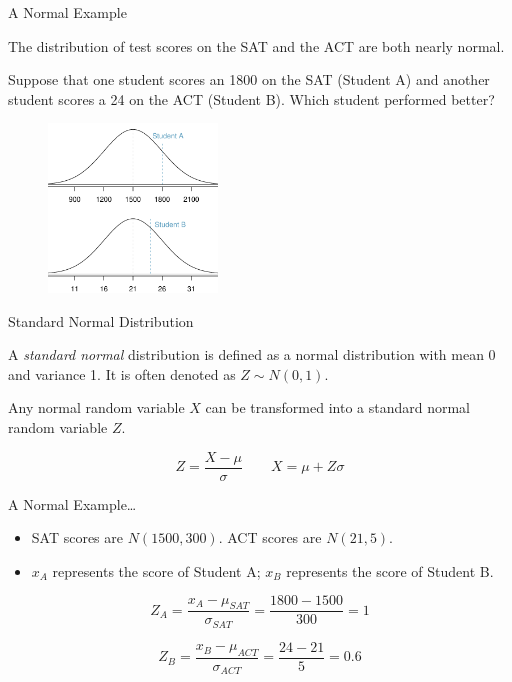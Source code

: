 \documentclass[ignorenonframetext,aspectratio=169]{beamer}
\begin{document}
\begin{frame}{A Normal Example}

The distribution of test scores on the SAT and the ACT are both nearly
normal.

Suppose that one student scores an 1800 on the SAT (Student A) and
another student scores a 24 on the ACT (Student B). Which student
performed better?

\begin{figure}[]
\includegraphics[width=0.4\textwidth]
{./figures/satActNormals.pdf}
\end{figure}

\end{frame}

\begin{frame}{Standard Normal Distribution}

A \emph{standard normal} distribution is defined as a normal
distribution with mean 0 and variance 1. It is often denoted as
\(Z \sim N(0, 1)\).

Any normal random variable \(X\) can be transformed into a standard
normal random variable \(Z\).

\[Z = \dfrac{X - \mu}{\sigma} \qquad X = \mu + Z\sigma \]

\end{frame}

\begin{frame}{A Normal Example\ldots{}}

\begin{itemize}
\item
  SAT scores are \(N(1500, 300)\). ACT scores are \(N(21,5)\).
\item
  \(x_A\) represents the score of Student A; \(x_B\) represents the
  score of Student B.
\end{itemize}

\[Z_{A} = \frac{x_{A} - \mu_{SAT}}{\sigma_{SAT}} = \frac{1800-1500}{300} = 1 \]

\[Z_{B} = \frac{x_{B} - \mu_{ACT}}{\sigma_{ACT}} = \frac{24 - 21}{5} = 0.6\]

\end{frame}
\end{document}
